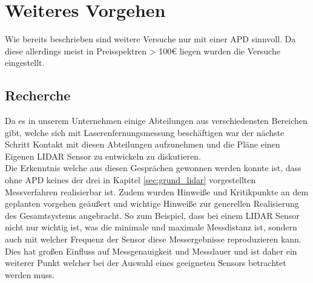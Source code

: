\section{Weiteres Vorgehen}
Wie bereits beschrieben sind weitere Versuche nur mit einer \ac{APD} sinnvoll. Da diese allerdings meist in Preisspektren > 100€ liegen wurden die Versuche eingestellt.
\subsection{Recherche}
Da es in unserem Unternehmen einige Abteilungen aus verschiedensten Bereichen gibt, welche sich mit Laserenfernungsmessung beschäftigen war der nächste Schritt Kontakt mit diesen Abteilungen aufzunehmen und die Pläne einen Eigenen \ac{LIDAR} Sensor zu entwickeln zu diskutieren. \\ 
Die Erkenntnis welche aus diesen Gesprächen gewonnen werden konnte ist, dass ohne \ac{APD} keines der drei in Kapitel \ref{sec:grund_lidar} vorgestellten Messverfahren realisierbar ist. Zudem wurden Hinweiße und Kritikpunkte an dem geplanten vorgehen geäußert und wichtige Hinweiße zur generellen Realisierung des Gesamtsystems angebracht. So zum Beispiel, dass bei einem \ac{LIDAR} Sensor nicht nur wichtig ist, was die minimale und maximale Messdistanz ist, sondern auch mit welcher Frequenz der Sensor diese Messergebnisse reproduzieren kann. Dies hat großen Einfluss auf Messgenauigkeit und Messdauer und ist daher ein weiterer Punkt welcher bei der Auswahl eines geeigneten Sensors betrachtet werden muss.
